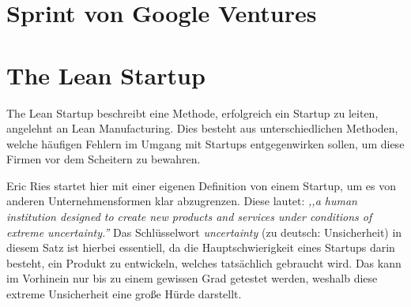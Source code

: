 \section{Sprint von Google Ventures}
\section{The Lean Startup}

The Lean Startup beschreibt eine Methode, erfolgreich ein Startup zu leiten, angelehnt an Lean Manufacturing. Dies besteht aus unterschiedlichen Methoden, welche häufigen Fehlern im Umgang mit Startups entgegenwirken sollen, um diese Firmen vor dem Scheitern zu bewahren.

Eric Ries startet hier mit einer eigenen Definition von einem Startup, um es von anderen Unternehmensformen klar abzugrenzen. Diese lautet: \textit{,,a human institution designed to create new products and services under conditions of extreme uncertainty.''}
Das Schlüsselwort \textit{uncertainty} (zu deutsch: Unsicherheit) in diesem Satz ist hierbei essentiell, da die Hauptschwierigkeit eines Startups darin besteht, ein Produkt zu entwickeln, welches tatsächlich gebraucht wird. Das kann im Vorhinein nur bis zu einem gewissen Grad getestet werden, weshalb diese extreme Unsicherheit eine große Hürde darstellt.

